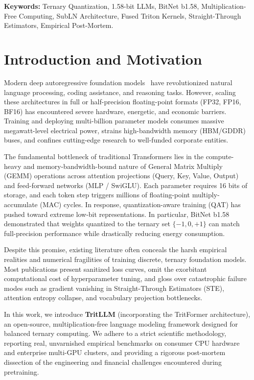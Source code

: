 \documentclass[11pt,a4paper]{article}
\begin{document}
\vspace{0.5em}
\noindent\textbf{Keywords:} Ternary Quantization, 1.58-bit LLMs, BitNet b1.58, Multiplication-Free Computing, SubLN Architecture, Fused Triton Kernels, Straight-Through Estimators, Empirical Post-Mortem.

\section{Introduction and Motivation}

Modern deep autoregressive foundation models~\cite{vaswani2017attention, touvron2023llama} have revolutionized natural language processing, coding assistance, and reasoning tasks. However, scaling these architectures in full or half-precision floating-point formats (FP32, FP16, BF16) has encountered severe hardware, energetic, and economic barriers. Training and deploying multi-billion parameter models consumes massive megawatt-level electrical power, strains high-bandwidth memory (HBM/GDDR) buses, and confines cutting-edge research to well-funded corporate entities.

The fundamental bottleneck of traditional Transformers lies in the compute-heavy and memory-bandwidth-bound nature of General Matrix Multiply (GEMM) operations across attention projections (Query, Key, Value, Output) and feed-forward networks (MLP / SwiGLU). Each parameter requires 16 bits of storage, and each token step triggers millions of floating-point multiply-accumulate (MAC) cycles. In response, quantization-aware training (QAT) has pushed toward extreme low-bit representations. In particular, BitNet b1.58~\cite{ma2024era} demonstrated that weights quantized to the ternary set $\{-1, 0, +1\}$ can match full-precision performance while drastically reducing energy consumption.

Despite this promise, existing literature often conceals the harsh empirical realities and numerical fragilities of training discrete, ternary foundation models. Most publications present sanitized loss curves, omit the exorbitant computational cost of hyperparameter tuning, and gloss over catastrophic failure modes such as gradient vanishing in Straight-Through Estimators (STE), attention entropy collapse, and vocabulary projection bottlenecks.

In this work, we introduce \textbf{TritLLM} (incorporating the TritFormer architecture), an open-source, multiplication-free language modeling framework designed for balanced ternary computing. We adhere to a strict scientific methodology, reporting real, unvarnished empirical benchmarks on consumer CPU hardware and enterprise multi-GPU clusters, and providing a rigorous post-mortem dissection of the engineering and financial challenges encountered during pretraining.
\end{document}
